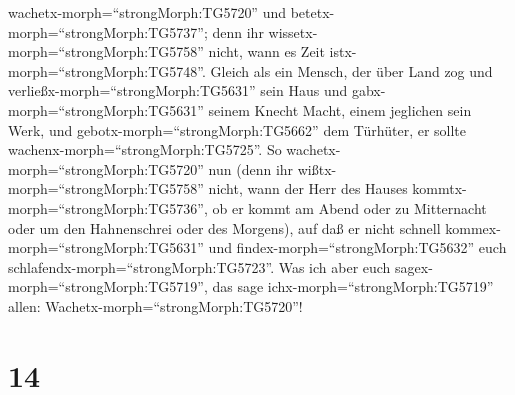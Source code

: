 wachetx-morph=``strongMorph:TG5720'' und
betetx-morph=``strongMorph:TG5737''; denn ihr
wissetx-morph=``strongMorph:TG5758'' nicht, wann es Zeit
istx-morph=``strongMorph:TG5748''.  Gleich als ein Mensch,
der über Land zog und verließx-morph=``strongMorph:TG5631'' sein Haus
und gabx-morph=``strongMorph:TG5631'' seinem Knecht Macht, einem
jeglichen sein Werk, und gebotx-morph=``strongMorph:TG5662'' dem
Türhüter, er sollte wachenx-morph=``strongMorph:TG5725''. 
So wachetx-morph=``strongMorph:TG5720'' nun (denn ihr
wißtx-morph=``strongMorph:TG5758'' nicht, wann der Herr des Hauses
kommtx-morph=``strongMorph:TG5736'', ob er kommt am Abend oder zu
Mitternacht oder um den Hahnenschrei oder des Morgens), 
auf daß er nicht schnell kommex-morph=``strongMorph:TG5631'' und
findex-morph=``strongMorph:TG5632'' euch
schlafendx-morph=``strongMorph:TG5723''.  Was ich aber euch
sagex-morph=``strongMorph:TG5719'', das sage
ichx-morph=``strongMorph:TG5719'' allen:
Wachetx-morph=``strongMorph:TG5720''!

\hypertarget{section-13}{%
\section{14}\label{section-13}}


